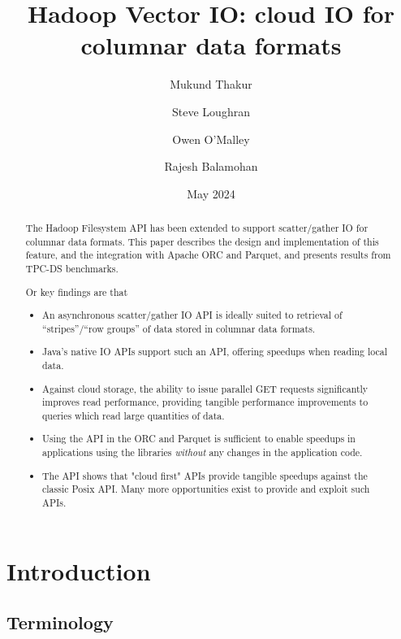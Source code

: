 \documentclass[manuscript]{acmart}
\title[Hadoop Vector IO]{Hadoop Vector IO: cloud IO for columnar data formats}
\author{Mukund Thakur}
\author{Steve Loughran}
\author{Owen O'Malley}
\author{Rajesh Balamohan}
\date{May 2024}
\begin{document}

\begin{abstract}
The Hadoop Filesystem API has been extended to support scatter/gather IO
for columnar data formats.
This paper describes the design and implementation of this feature,
and the integration with Apache ORC and Parquet, and
presents results from TPC-DS benchmarks.

Or key findings are that
\begin{itemize}
  \item An asynchronous scatter/gather IO API is ideally suited to retrieval
  of ``stripes''/``row groups'' of data stored in columnar data formats.
  \item Java's native IO APIs support such an API, offering speedups when reading
  local data.
  \item Against cloud storage, the ability to issue parallel GET requests
        significantly improves read performance, providing tangible performance
        improvements to queries which read large quantities of data.
  \item Using the API in the ORC and Parquet is sufficient to enable
        speedups in applications using the libraries \emph{without} any
        changes in the application code.
  \item The API shows that "cloud first" APIs provide tangible speedups
        against the classic Posix API. Many more opportunities exist to
        provide and exploit such APIs.
\end{itemize}

\end{abstract}



\maketitle


\section{Introduction}
\label{sec:introduction}



\subsection{Terminology}\label{subsec:terminology}
\end{document}
